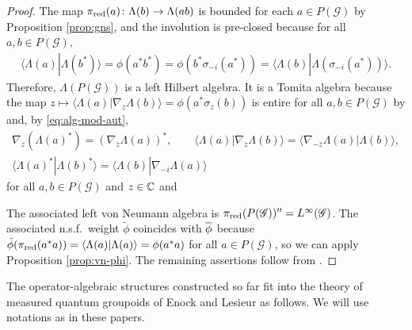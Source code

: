 \begin{proof}
The map $\pi_{\operatorname{\mathrm{red}}}(a)\colon \Lambda(b) \to \Lambda(ab)$ is bounded for
  each $a \in P(\mathscr{G})$ by Proposition \ref{prop:gns}, and the
  involution is pre-closed because for all $a,b \in P(\mathscr{G})$,
  \begin{align*}
    \langle \Lambda(a)|\Lambda(b^{*})\rangle = \phi(a^{*}b^{*}) =
    \phi(b^{*}\sigma_{-i}(a^{*})) = \langle
    \Lambda(b)|\Lambda(\sigma_{-i}(a^{*}))\rangle.
  \end{align*}
  Therefore, $\Lambda(P(\mathscr{G}))$ is a left Hilbert algebra. It
  is a Tomita algebra because the
  map $z\mapsto \langle \Lambda(a)|\nabla_{z}\Lambda(b)\rangle =
  \phi(a^{*}\sigma_{z}(b))$ is entire for all $a,b\in P(\mathscr{G})$  by
 \cite[Theorem 2.25]{DCT1}
  and, by \eqref{eq:alg-mod-aut}, 
  \begin{gather*}
    \nabla_{z}(\Lambda(a)^{*}) = (\nabla_{\overline{z}}\Lambda(a))^{*}, \qquad
    \langle \Lambda(a)|\nabla_{z}\Lambda(b)\rangle = \langle
    \nabla_{-\overline{z}}\Lambda(a) |\Lambda(b)\rangle, \\ \langle
    \Lambda(a)^{*}|\Lambda(b)^{*}\rangle = \langle \Lambda(b)|\nabla_{-i}\Lambda(a)\rangle
  \end{gather*}
  for all $a,b\in P(\mathscr{G})$ and $z\in \mathbb{C}$ and   

 The associated left von Neumann algebra is $\pi_{\operatorname{\mathrm{red}}}(P(\mathscr{G}))''=L^{\infty}(\mathscr{G})$. The
 associated n.s.f.\ weight $\tilde\phi$ coincides with $\overline{\phi}$ because
 $\tilde \phi(\pi_{\operatorname{\mathrm{red}}}(a^{*}a))=\langle\Lambda(a)|\Lambda(a)\rangle =
 \phi(a^{*}a)$ for all $a\in P(\mathscr{G})$, so we can apply Proposition \ref{prop:vn-phi}. The remaining
 assertions follow  from
  \cite[Theorem VI.2.2 and its proof]{Taksak2}.
\end{proof}


The operator-algebraic structures constructed so far fit into the
theory of measured quantum groupoids of Enock and Lesieur \cite{Eno2,Les1} as follows. We will use notations as in these papers.

